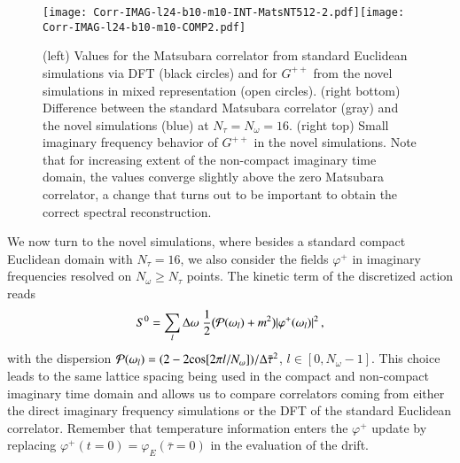 \documentclass[epj]{webofc}
\begin{document}
\begin{figure}[t]
\centering
\texttt{[image: Corr-IMAG-l24-b10-m10-INT-MatsNT512-2.pdf]}\texttt{[image: Corr-IMAG-l24-b10-m10-COMP2.pdf]}\caption{(left) Values for the Matsubara correlator from standard Euclidean simulations via DFT (black circles) and for $G^{++}$ from the novel simulations in mixed representation (open circles). (right bottom) Difference between the standard Matsubara correlator  (gray) and the novel simulations (blue) at $N_\tau=N_\omega=16$. (right top) Small imaginary frequency behavior of $G^{++}$ in the novel simulations. Note that for increasing extent of the non-compact imaginary time domain, the values converge slightly above the zero Matsubara correlator, a change that turns out to be important to obtain the correct spectral reconstruction.}\label{Fig:FullSims}\vspace{-0.65cm}
\end{figure}

We now turn to the novel simulations, where besides a standard compact Euclidean domain with $N_\tau=16$, we also consider the fields $\varphi^+$ in imaginary frequencies resolved on $N_\omega\geq N_\tau$ points. The kinetic term of the discretized action reads 
\begin{equation}\label{eq:S0}
  S^0=\sum_l \Delta\omega\; \frac{1}{2}\big({\cal P}(\omega_l) + m^2\big)
  |\varphi^+(\omega_l)|^2\,,  
\end{equation}
with the dispersion ${\cal P}(\omega_l)=(2-2{\rm cos}[2\pi l /N_\omega ])/\Delta \bar \tau^2$, $l\in [0,N_\omega-1]$. This choice leads to the same lattice spacing being used in the compact and non-compact imaginary time domain and allows us to compare correlators coming from either the direct imaginary frequency simulations or the DFT of the standard Euclidean correlator. Remember that temperature information enters the $\varphi^+$ update by replacing $\varphi^+(t=0)=\varphi_E(\bar{\tau}=0)$ in the evaluation of the drift.
\end{document}
